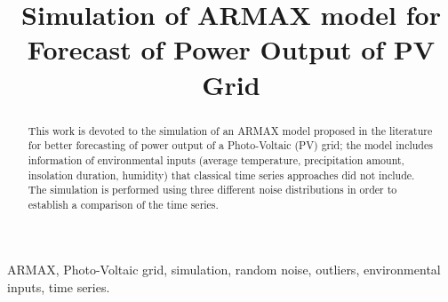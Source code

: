 \documentclass[conference]{IEEEtran}
\begin{document}
\title{Simulation of ARMAX model for Forecast of Power Output of PV Grid\\}

\author{
\and
{}
}

\maketitle

\begin{abstract}
This work is devoted to the simulation of an ARMAX model proposed in the literature for better forecasting of power output of a Photo-Voltaic (PV) grid; the model includes information of environmental inputs (average temperature, precipitation amount, insolation duration, humidity) that classical time series approaches did not include. The simulation is performed using three different noise distributions in order to establish a comparison of the time series.
\end{abstract}

\begin{IEEEkeywords}
ARMAX, Photo-Voltaic grid, simulation, random noise, outliers, environmental inputs, time series.
\end{IEEEkeywords}







\nocite{*}


\end{document}
